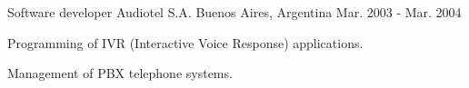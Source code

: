 \begin{cventries}
  \cventry
    {Software developer} %
    {Audiotel S.A.} %
    {Buenos Aires, Argentina} %
    {Mar. 2003 - Mar. 2004} %
    {
      \begin{cvitems}
        \item Programming of IVR (Interactive Voice Response) applications.
        \item Management of PBX telephone systems.
      \end{cvitems}
    }

\end{cventries}
